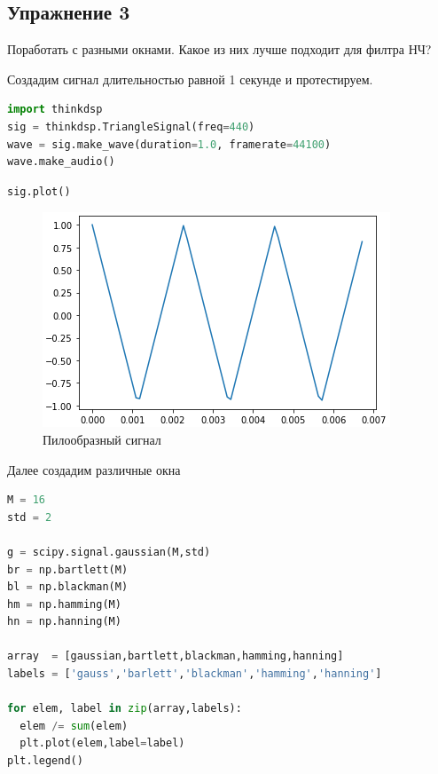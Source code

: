 \subsection{Упражнение 3}

Поработать с разными окнами. Какое из них лучше подходит для филтра НЧ?

Создадим сигнал длительностью равной 1 секунде и протестируем.

\begin{lstlisting}[language=Python]
import thinkdsp
sig = thinkdsp.TriangleSignal(freq=440)
wave = sig.make_wave(duration=1.0, framerate=44100)
wave.make_audio()
\end{lstlisting}

\begin{lstlisting}[language=Python]
sig.plot()
\end{lstlisting}

\begin{figure}[H]
	\begin{center}
		\includegraphics[scale=1]{fig/lab08/lab8_7.png}
		\caption{Пилообразный сигнал}
	\end{center}
\end{figure}

Далее создадим различные окна


\begin{lstlisting}[language=Python]
M = 16
std = 2

g = scipy.signal.gaussian(M,std)
br = np.bartlett(M)
bl = np.blackman(M)
hm = np.hamming(M)
hn = np.hanning(M)

array  = [gaussian,bartlett,blackman,hamming,hanning]
labels = ['gauss','barlett','blackman','hamming','hanning']

for elem, label in zip(array,labels):
  elem /= sum(elem)
  plt.plot(elem,label=label)
plt.legend()
\end{lstlisting}

